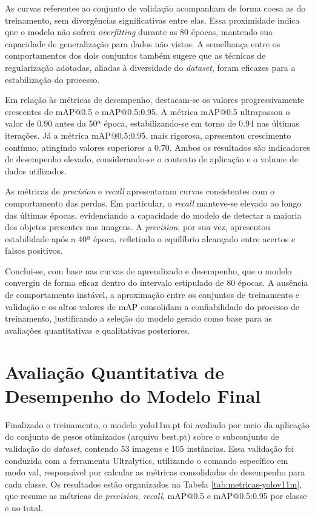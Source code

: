 As curvas referentes ao conjunto de validação acompanham de forma coesa as do treinamento, sem divergências significativas entre elas. Essa proximidade indica que o modelo não sofreu \textit{overfitting} durante as 80 épocas, mantendo sua capacidade de generalização para dados não vistos. A semelhança entre os comportamentos dos dois conjuntos também sugere que as técnicas de regularização adotadas, aliadas à diversidade do \textit{dataset}, foram eficazes para a estabilização do processo.

Em relação às métricas de desempenho, destacam-se os valores progressivamente crescentes de mAP@0.5 e mAP@0.5:0.95. A métrica mAP@0.5 ultrapassou o valor de 0.90 antes da 50ª época, estabilizando-se em torno de 0.94 nas últimas iterações. Já a métrica mAP@0.5:0.95, mais rigorosa, apresentou crescimento contínuo, atingindo valores superiores a 0.70. Ambos os resultados são indicadores de desempenho elevado, considerando-se o contexto de aplicação e o volume de dados utilizados.

As métricas de \textit{precision} e \textit{recall} apresentaram curvas consistentes com o comportamento das perdas. Em particular, o \textit{recall} manteve-se elevado ao longo das últimas épocas, evidenciando a capacidade do modelo de detectar a maioria dos objetos presentes nas imagens. A \textit{precision}, por sua vez, apresentou estabilidade após a 40ª época, refletindo o equilíbrio alcançado entre acertos e falsos positivos.

Conclui-se, com base nas curvas de aprendizado e desempenho, que o modelo convergiu de forma eficaz dentro do intervalo estipulado de 80 épocas. A ausência de comportamento instável, a aproximação entre os conjuntos de treinamento e validação e os altos valores de mAP consolidam a confiabilidade do processo de treinamento, justificando a seleção do modelo gerado como base para as avaliações quantitativas e qualitativas posteriores.

\section{\textbf{Avaliação Quantitativa de Desempenho do Modelo Final}}

Finalizado o treinamento, o modelo yolo11m.pt foi avaliado por meio da aplicação do conjunto de pesos otimizados (arquivo best.pt) sobre o subconjunto de validação do \textit{dataset}, contendo 53 imagens e 105 instâncias. Essa validação foi conduzida com a ferramenta Ultralytics, utilizando o comando específico em modo val, responsável por calcular as métricas consolidadas de desempenho para cada classe. Os resultados estão organizados na Tabela \ref{tab:metricas-yolov11m}, que resume as métricas de \textit{precision}, \textit{recall}, mAP@0.5 e mAP@0.5:0.95 por classe e no total.

